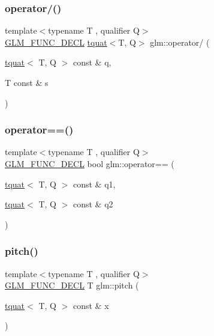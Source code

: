 \subsubsection{\texorpdfstring{operator/()}{operator/()}}
{\footnotesize\ttfamily template$<$typename T , qualifier Q$>$ \\
\mbox{\hyperlink{setup_8hpp_ab2d052de21a70539923e9bcbf6e83a51}{G\+L\+M\+\_\+\+F\+U\+N\+C\+\_\+\+D\+E\+CL}} \mbox{\hyperlink{structglm_1_1tquat}{tquat}}$<$T, Q$>$ glm\+::operator/ (\begin{DoxyParamCaption}\item[{\mbox{\hyperlink{structglm_1_1tquat}{tquat}}$<$ T, Q $>$ const \&}]{q,  }\item[{T const \&}]{s }\end{DoxyParamCaption})}

\mbox{\label{group__gtc__quaternion_ga5892999628e2bcd46279c8df9be904b7}} 
\subsubsection{\texorpdfstring{operator==()}{operator==()}}
{\footnotesize\ttfamily template$<$typename T , qualifier Q$>$ \\
\mbox{\hyperlink{setup_8hpp_ab2d052de21a70539923e9bcbf6e83a51}{G\+L\+M\+\_\+\+F\+U\+N\+C\+\_\+\+D\+E\+CL}} bool glm\+::operator== (\begin{DoxyParamCaption}\item[{\mbox{\hyperlink{structglm_1_1tquat}{tquat}}$<$ T, Q $>$ const \&}]{q1,  }\item[{\mbox{\hyperlink{structglm_1_1tquat}{tquat}}$<$ T, Q $>$ const \&}]{q2 }\end{DoxyParamCaption})}

\mbox{\label{group__gtc__quaternion_ga9bd78e5fe153d07e39fb4c83e73dba73}} 
\subsubsection{\texorpdfstring{pitch()}{pitch()}}
{\footnotesize\ttfamily template$<$typename T , qualifier Q$>$ \\
\mbox{\hyperlink{setup_8hpp_ab2d052de21a70539923e9bcbf6e83a51}{G\+L\+M\+\_\+\+F\+U\+N\+C\+\_\+\+D\+E\+CL}} T glm\+::pitch (\begin{DoxyParamCaption}\item[{\mbox{\hyperlink{structglm_1_1tquat}{tquat}}$<$ T, Q $>$ const \&}]{x }\end{DoxyParamCaption})}

